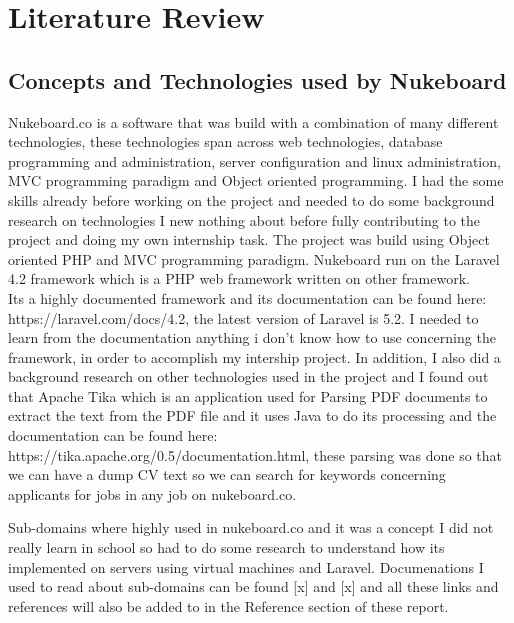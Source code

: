 
\chapter{Literature Review} %

\label{Chapter2} %


\section{Concepts and Technologies used by Nukeboard}

Nukeboard.co is a software that was build with a combination of many different technologies, these technologies span across web technologies, database programming and administration, server configuration and linux administration, MVC programming paradigm and Object oriented programming. I had the some skills already before working on the project and needed to do some background research on technologies I new nothing about before fully contributing to the project and doing my own internship task.  The project was build using Object oriented PHP and MVC programming paradigm. Nukeboard run on the Laravel 4.2 framework which is a PHP web framework written on other framework. \\

Its a highly documented framework and its documentation can be found here: https://laravel.com/docs/4.2, the latest version of Laravel is 5.2. I needed to learn from the documentation anything i don't know how to use concerning the framework, in order to accomplish my intership project. In addition, I also did a background research on other technologies used in the project and I found out that Apache Tika which is an application used for Parsing PDF documents to extract the text from the PDF file and it uses Java to do its processing and the documentation can be found here: https://tika.apache.org/0.5/documentation.html, these parsing was done so that we can have a dump CV text so we can search for keywords concerning applicants for jobs in any job on nukeboard.co.

Sub-domains where highly used in nukeboard.co and it was a concept I did not really learn in school so had to do some research to understand how its implemented on servers using virtual machines and Laravel. Documenations I used to read about sub-domains can be found [x] and [x] and all these links and references will also be added to in the Reference section of these report. \\

